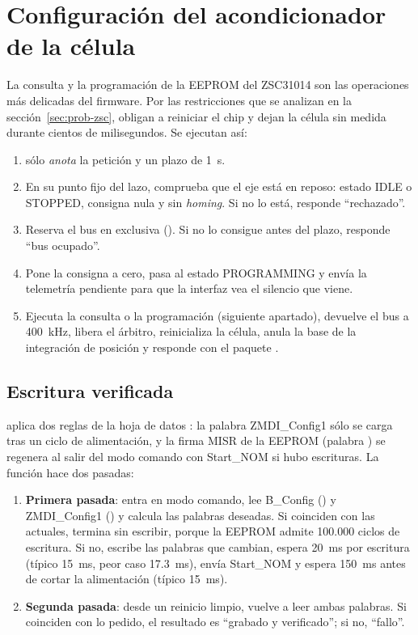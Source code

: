 \section{Configuración del acondicionador de la célula}

La consulta y la programación de la EEPROM del ZSC31014 son las operaciones más delicadas del
firmware. Por las restricciones que se analizan en la sección~\ref{sec:prob-zsc}, obligan a reiniciar
el chip y dejan la célula sin medida durante cientos de milisegundos. Se ejecutan así:

\begin{enumerate}
  \item {} sólo \emph{anota} la petición y un plazo de \SI{1}{\second}.
  \item En su punto fijo del lazo,  comprueba que el eje está en reposo:
        estado IDLE o STOPPED, consigna nula y sin \emph{homing}. Si no lo está, responde
        ``rechazado''.
  \item Reserva el bus en exclusiva (). Si no lo consigue antes del plazo, responde
        ``bus ocupado''.
  \item Pone la consigna a cero, pasa al estado PROGRAMMING y envía la telemetría pendiente para que la
        interfaz vea el silencio que viene.
  \item Ejecuta la consulta o la programación (siguiente apartado), devuelve el bus a
        \SI{400}{\kilo\hertz}, libera el árbitro, reinicializa la célula, anula la base de la
        integración de posición y responde con el paquete .
\end{enumerate}

\subsection{Escritura verificada}

 aplica dos reglas de la hoja de datos \cite{zsc31014}: la palabra ZMDI\_Config1
sólo se carga tras un ciclo de alimentación, y la firma MISR de la EEPROM (palabra ) se
regenera al salir del modo comando con Start\_NOM si hubo escrituras. La función hace dos pasadas:

\begin{enumerate}
  \item \textbf{Primera pasada}: entra en modo comando, lee B\_Config () y ZMDI\_Config1
        () y calcula las palabras deseadas. Si coinciden con las actuales, termina sin
        escribir, porque la EEPROM admite 100.000 ciclos de escritura. Si no, escribe las palabras que
        cambian, espera \SI{20}{\milli\second} por escritura (típico \SI{15}{\milli\second}, peor caso
        \SI{17.3}{\milli\second}), envía Start\_NOM y espera \SI{150}{\milli\second} antes de cortar la
        alimentación (típico \SI{15}{\milli\second}).
  \item \textbf{Segunda pasada}: desde un reinicio limpio, vuelve a leer ambas palabras. Si coinciden
        con lo pedido, el resultado es ``grabado y verificado''; si no, ``fallo''.
\end{enumerate}

